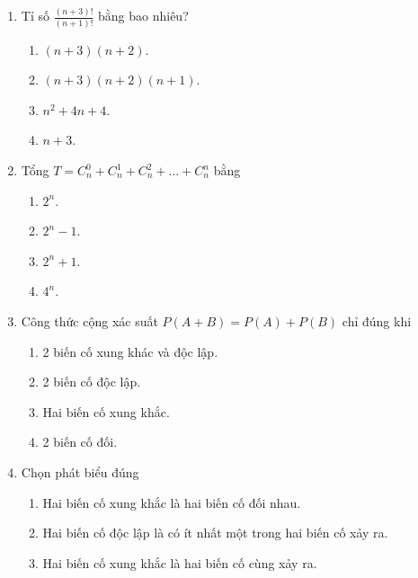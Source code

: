 \begin{enumerate}[label=\textbf{Câu \arabic*.},align=left,left=0cm..0cm,itemindent=*]
	(II) Mỗi hoán vị $n$ phần tử của một tập hợp là một chỉnh hợp chập $n$ của $n$ phần tử đó.\par
	Hãy chọn phương án đúng.
	\begin{enumerate}[label=\textbf{\Alph*.},align=left,left=1cm..0cm,itemindent=*]
		\item Chỉ có (I) đúng. \item Chỉ có (II) đúng. \item (I) và (II) đều đúng. \item (I) và (II) đều sai.
	\end{enumerate}
	\item Tỉ số $\frac{(n+3)!}{(n+1)!}$ bằng bao nhiêu?
	\begin{enumerate}[label=\textbf{\Alph*.},align=left,left=1cm..0cm,itemindent=*]
		\item $(n+3)(n+2)$. \item $(n+3)(n+2)(n+1)$. \item $n^2+4n+4$. \item $n+3$.
	\end{enumerate}
	\item Tổng $T=C_n^0+C_n^1+C_n^2+...+C_n^n$ bằng
	\begin{enumerate}[label=\textbf{\Alph*.},align=left,left=1cm..0cm,itemindent=*]
		\item $2^n$. \item $2^n-1$. \item $2^n+1$. \item $4^n$.
	\end{enumerate}
	\item Công thức cộng xác suất $P(A+B)=P(A)+P(B)$ chỉ đúng khi
	\begin{enumerate}[label=\textbf{\Alph*.},align=left,left=1cm..0cm,itemindent=*]
		\item 2 biến cố xung khác và độc lập.
		\item 2 biến cố độc lập.
		\item Hai biến cố xung khắc.
		\item 2 biến cố đối.
	\end{enumerate}
	\item Chọn phát biểu đúng
	\begin{enumerate}[label=\textbf{\Alph*.},align=left,left=1cm..0cm,itemindent=*]
		\item Hai biến cố xung khắc là hai biến cố đối nhau.
		\item Hai biến cố độc lập là có ít nhất một trong hai biến cố xảy ra.
		\item Hai biến cố xung khắc là hai biến cố cùng xảy ra.

\end{enumerate}
\end{enumerate}
